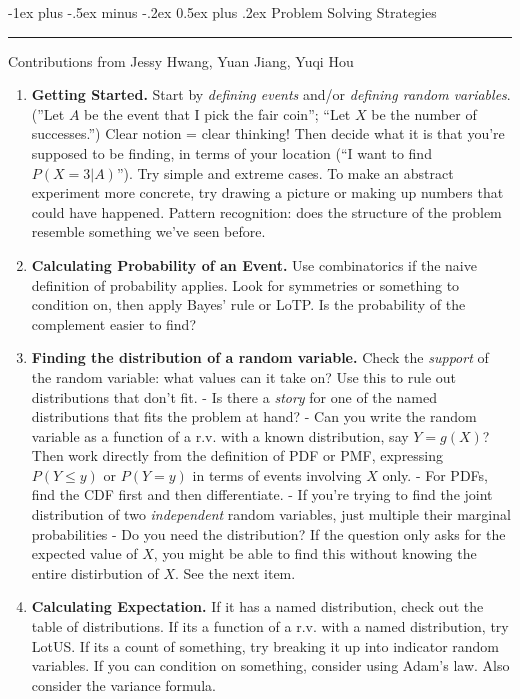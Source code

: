 \documentclass[10pt,landscape]{article}
\makeatletter
\renewcommand{\section}{\@startsection{section}{1}{0mm}%
                                {-1ex plus -.5ex minus -.2ex}%
                                {0.5ex plus .2ex}%
                                {\normalfont\large\bfseries}}
\makeatother
\begin{document}
\begin{multicols}{3}
\section{Problem Solving Strategies} \smallskip \hrule height 2pt \smallskip

Contributions from Jessy Hwang, Yuan Jiang, Yuqi Hou

\begin{enumerate} \itemsep -.25em
\item \textbf{Getting Started.} Start by \emph{defining events} and/or \emph{defining random variables}. (''Let $A$ be the event that I pick the fair coin''; ``Let $X$ be the number of successes.'') Clear notion = clear thinking! Then decide what it is that you're supposed to be finding, in terms of your location (``I want to find $P(X=3|A)$''). Try simple and extreme cases. To make an abstract experiment more concrete, try drawing a picture or making up numbers that could have happened. Pattern recognition: does the structure of the problem resemble something we've seen before.
\item \textbf{Calculating Probability of an Event.} Use combinatorics if the naive definition of probability applies. Look for symmetries or something to condition on, then apply Bayes' rule or LoTP. Is the probability of the complement easier to find?
\item \textbf{Finding the distribution of a random variable.} Check the \emph{support} of the random variable: what values can it take on? Use this to rule out distributions that don't fit. - Is there a \emph{story} for one of the named distributions that fits the problem at hand? - Can you write the random variable as a function of a r.v. with a known distribution, say $Y = g(X)$? Then work directly from the definition of PDF or PMF, expressing $P(Y \leq y)$ or $P(Y = y)$ in terms of events involving $X$ only. - For PDFs, find the CDF first and then differentiate. - If you're trying to find the joint distribution of two \emph{independent} random variables, just multiple their marginal probabilities - Do you need the distribution? If the question only asks for the expected value of $X$, you might be able to find this without knowing the entire distirbution of $X$. See the next item.
\item \textbf{Calculating Expectation.} If it has a named distribution, check out the table of distributions. If its a function of a r.v. with a named distribution, try LotUS. If its a count of something, try breaking it up into indicator random variables. If you can condition on something, consider using Adam's law. Also consider the variance formula.

\end{enumerate}
\end{multicols}
\end{document}
